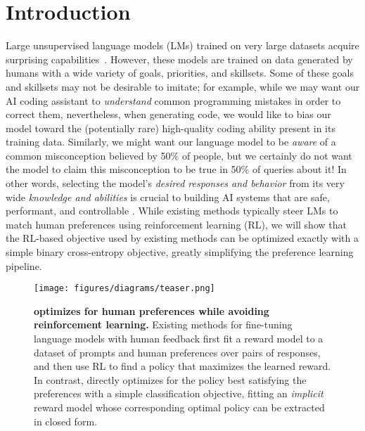 \documentclass{article}
\newcommand{\rev}[2]{{#2}}
\begin{document}
\section{Introduction}
Large unsupervised language models (LMs) trained on very large datasets
acquire surprising capabilities~\citep{chowdhery2022palm, brown2020language, touvron2023llama,bubeck2023sparks}. However, these models are trained on data generated by humans with a wide variety of goals, priorities, and skillsets. Some of these goals and skillsets may not be desirable to imitate; for example, while we may want our AI coding assistant to \textit{understand} common programming mistakes in order to correct them, nevertheless, when generating code, we would like to bias our model toward the (potentially rare) high-quality coding ability present in its training data. Similarly, we might want our language model to be \textit{aware} of a common misconception believed by 50\% of people, but we certainly do not want the model to claim this misconception to be true in 50\% of queries about it! In other words, selecting the model's \emph{desired responses and behavior} from its very wide \textit{knowledge and abilities} is crucial to building AI systems that are safe, performant, and controllable \citep{ouyang2022training}. While existing methods typically steer LMs to match human preferences using reinforcement learning (RL), we will show that the RL-based objective used by existing methods can be optimized exactly with a simple binary cross-entropy objective, greatly simplifying the preference learning pipeline.


\begin{figure}
    \centering
    \texttt{[image: figures/diagrams/teaser.png]}
    \caption{\textbf{{\methodac} optimizes for human preferences while avoiding reinforcement learning.} Existing methods for fine-tuning language models with human feedback first fit a reward model to a dataset of prompts and human preferences over pairs of responses, and then use RL to find a policy that maximizes the learned reward. In contrast, {\methodac} directly optimizes for the policy best satisfying the preferences with a simple classification objective, \rev{without an explicit standalone reward model or RL}{fitting an \textit{implicit} reward model whose corresponding optimal policy can be extracted in closed form}.}
    \vspace{-2mm}
    \label{fig:teaser}
\end{figure}
\end{document}
